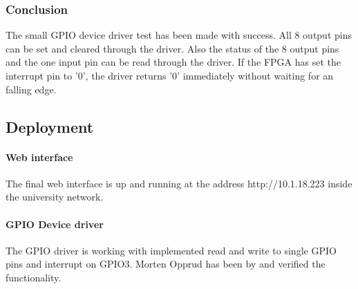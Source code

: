 %
\subsubsection{Conclusion}
The small GPIO device driver test has been made with success. All 8 output pins can be set and cleared through the driver. Also the status of the 8 output pins and the one input pin can be read through the driver. If the FPGA has set the interrupt pin to '0', the driver returns '0' immediately without waiting for an falling edge.
\subsection{Deployment}
\paragraph{Web interface}
The final web interface is up and running at the address http://10.1.18.223 inside the university network.
%
%
\paragraph{GPIO Device driver}
The GPIO driver is working with implemented read and write to single GPIO pins and interrupt on GPIO3. Morten Opprud has been by and verified the functionality.
%
%